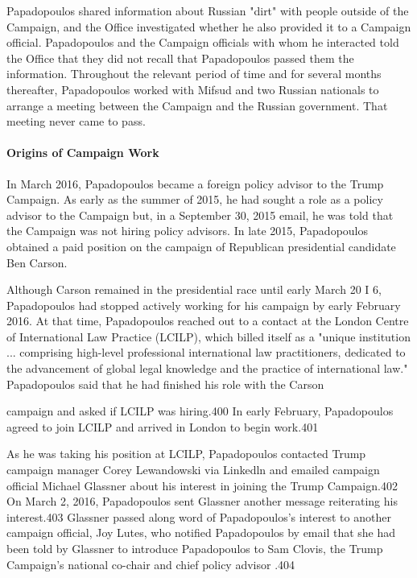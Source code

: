 Papadopoulos shared information about Russian "dirt" with people outside of the Campaign, and the Office investigated whether he also provided it to a Campaign official.
Papadopoulos and the Campaign officials with whom he interacted told the Office that they did not recall that Papadopoulos passed them the information.
Throughout the relevant period of time and for several months thereafter, Papadopoulos worked with Mifsud and two Russian nationals to arrange a meeting between the Campaign and the Russian government.
That meeting never came to pass.

\paragraph{Origins of Campaign Work}

In March 2016, Papadopoulos became a foreign policy advisor to the Trump Campaign.%
As early as the summer of 2015, he had sought a role as a policy advisor to the Campaign but, in a September 30, 2015 email, he was told that the Campaign was not hiring policy advisors.%
In late 2015, Papadopoulos obtained a paid position on the campaign of Republican presidential candidate Ben Carson.%

Although Carson remained in the presidential race until early March 20 I 6, Papadopoulos had stopped actively working for his campaign by early February 2016.%
At that time, Papadopoulos reached out to a  contact at the London Centre of International Law Practice (LCILP), which billed itself as a "unique institution ...  comprising high-level professional international law practitioners, dedicated to the advancement of global legal knowledge and the practice of international law."%
Papadopoulos said that he had finished his role with the Carson

campaign and asked if LCILP was hiring.400 In early February, Papadopoulos agreed to join LCILP and arrived in London to begin work.401

As he was taking his position at LCILP, Papadopoulos contacted Trump campaign manager Corey Lewandowski via Linkedln and emailed campaign official Michael Glassner about his interest in joining the Trump Campaign.402 On March 2, 2016, Papadopoulos sent Glassner another message reiterating his interest.403 Glassner passed along word of Papadopoulos's interest to another campaign official, Joy Lutes, who notified Papadopoulos by email that she had been told by Glassner to introduce Papadopoulos to Sam Clovis, the Trump Campaign's national co-chair and chief policy advisor .404

